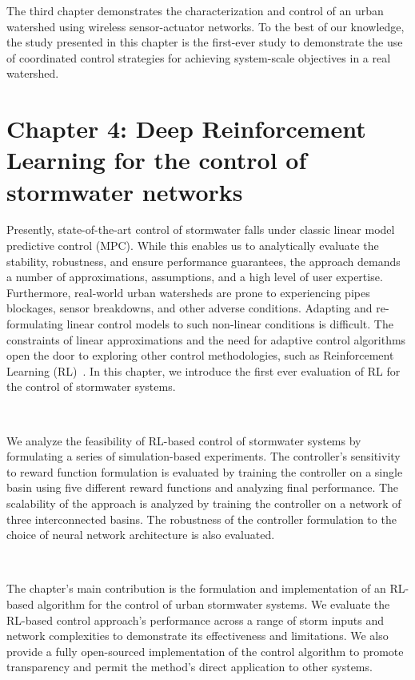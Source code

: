 The third chapter demonstrates the characterization and control of an urban watershed using wireless sensor-actuator networks. 
To the best of our knowledge, the study presented in this chapter is the first-ever study to demonstrate the use of coordinated control strategies for achieving system-scale objectives in a real watershed.

\section{Chapter 4: Deep Reinforcement Learning for the control of stormwater networks}

Presently, state-of-the-art control of stormwater falls under classic linear model predictive control (MPC)\cite{Wong_Kerkez_2018}.
While this enables us to analytically evaluate the stability, robustness, and ensure performance guarantees, the approach demands a number of approximations, assumptions, and a high level of user expertise\cite{Wong_Kerkez_2018, Ocampo-Martinez_2015, joseph2014hybrid}.
Furthermore, real-world urban watersheds are prone to experiencing pipes blockages, sensor breakdowns, and other adverse conditions\cite{national2009urban}.
Adapting and re-formulating linear control models to such non-linear conditions is difficult.
The constraints of linear approximations and the need for adaptive control algorithms open the door to exploring other control methodologies, such as Reinforcement Learning (RL)~\cite{Sutton98}.
In this chapter, we introduce the first ever evaluation of RL for the control of stormwater systems.

\

We analyze the feasibility of RL-based control of stormwater systems by formulating a series of simulation-based experiments.
The controller's sensitivity to reward function formulation is evaluated by training the controller on a single basin using five different reward functions and analyzing final performance.
The scalability of the approach is analyzed by training the controller on a network of three interconnected basins.
The robustness of the controller formulation to the choice of neural network architecture is also evaluated.


\

The chapter's main contribution is the formulation and implementation of an RL-based algorithm for the control of urban stormwater systems.
We evaluate the RL-based control approach's performance across a range of storm inputs and network complexities to demonstrate its effectiveness and limitations.
We also provide a fully open-sourced implementation of the control algorithm to promote transparency and permit the method's direct application to other systems.


